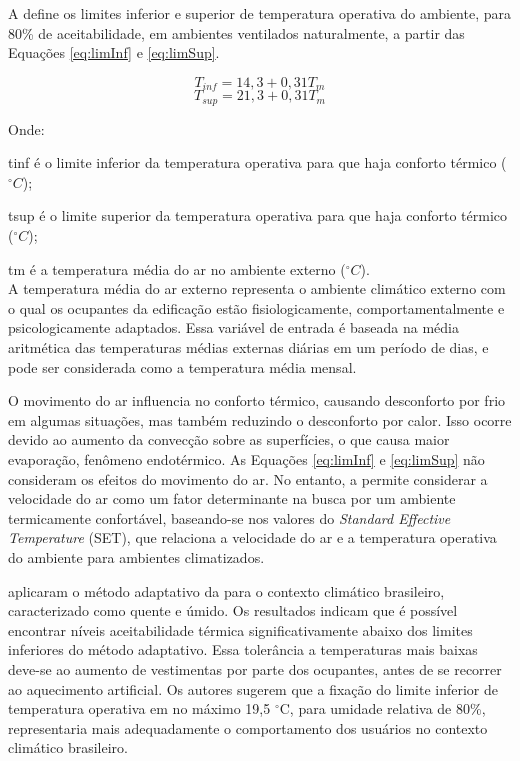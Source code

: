 A  define os limites inferior e superior de temperatura operativa do ambiente, para 80\% de aceitabilidade, em ambientes ventilados naturalmente, a partir das Equações \ref{eq:limInf} e \ref{eq:limSup}.

\begin{equation}\label{eq:limInf}
T_{inf} = 14,3 + 0,31 T_m
\end{equation}
\begin{equation}\label{eq:limSup}
T_{sup} = 21,3 + 0,31 T_m
\end{equation}

Onde:

\gls{tinf} é o limite inferior da temperatura operativa para que haja conforto térmico ($^{\circ}C$);

\gls{tsup} é o limite superior da temperatura operativa para que haja conforto térmico ($^{\circ}C$);

\gls{tm} é a temperatura média do ar no ambiente externo ($^{\circ}C$).
\\

A temperatura média do ar externo representa o ambiente climático externo com o qual os ocupantes da edificação estão fisiologicamente,
comportamentalmente e psicologicamente adaptados. Essa variável de entrada é baseada na média aritmética das temperaturas médias externas diárias em um período de dias, e pode ser considerada como a temperatura média mensal.

O movimento do ar influencia no conforto térmico, causando desconforto por frio em algumas situações, mas também reduzindo o desconforto por calor.
Isso ocorre devido ao aumento da convecção sobre as superfícies, o que causa maior evaporação, fenômeno endotérmico. As Equações \ref{eq:limInf} e \ref{eq:limSup} não consideram os efeitos do movimento do ar. No entanto, a  permite considerar a velocidade do ar como um fator determinante na busca por um ambiente termicamente confortável, baseando-se nos valores do  \textit{Standard Effective Temperature} (SET), que relaciona a velocidade do ar e a temperatura operativa do ambiente para ambientes climatizados.

 aplicaram o método adaptativo da  para o contexto climático brasileiro, caracterizado como quente e úmido. Os resultados indicam que é possível encontrar níveis aceitabilidade térmica significativamente abaixo dos limites inferiores do método adaptativo. Essa tolerância a temperaturas mais baixas deve-se ao aumento de vestimentas por parte dos ocupantes, antes de se recorrer ao aquecimento artificial. Os autores sugerem que a fixação do limite inferior de temperatura operativa em no máximo 19,5 $^{\circ}$C, para umidade relativa de 80\%, representaria mais adequadamente o comportamento dos usuários no contexto climático brasileiro.

